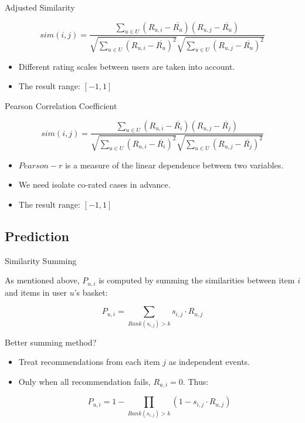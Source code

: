 \documentclass{beamer}
\begin{document}
\begin{frame}{Adjusted Similarity}

\begin{equation}
sim(i,j) = \frac{\sum_{u \in U}(R_{u,i} - \overline{R_u})(R_{u,j} - \overline{R_u})}{\sqrt{\sum_{u \in U}(R_{u,i} - \overline{R_u})^2}\sqrt{\sum_{u \in U}(R_{u,j} - \overline{R_u})^2}}
\end{equation}

\begin{itemize}
\item Different rating scales between users are taken into account.
\item The result range: $[-1,1]$
\end{itemize}

\end{frame}


\begin{frame}{Pearson Correlation Coefficient}

\begin{equation}
sim(i,j) = \frac{\sum_{u \in U}(R_{u,i} - \overline{R_i})(R_{u,j} - \overline{R_j})}{\sqrt{\sum_{u \in U}(R_{u,i} - \overline{R_i})^2}\sqrt{\sum_{u \in U}(R_{u,j} - \overline{R_j})^2}}
\end{equation}

\begin{itemize}
\item $Pearson-r$ is a measure of the linear dependence between two variables.
\item We need isolate co-rated cases in advance.
\item The result range: $[-1,1]$
\end{itemize}

\end{frame}


\subsection{Prediction}


\begin{frame}{Similarity Summing}

As mentioned above, $P_{u,i}$ is computed by summing the similarities between item $i$ and items in user $u$'s basket:

\begin{equation}
P_{u,i} = \sum_{Rank(s_{i,j})>k} s_{i,j} \cdot R_{u,j}
\end{equation}

\begin{block}{Better summing method?}
\begin{itemize}
\item Treat recommendations from each item $j$ as independent events.
\item Only when all recommendation fails, $R_{u,i} = 0$. Thus:

\begin{equation}
P_{u,i} = 1 - \prod_{Rank(s_{i,j})>k} (1 - s_{i,j} \cdot R_{u,j})
\end{equation}
\end{itemize}
\end{block}

\end{frame}
\end{document}
